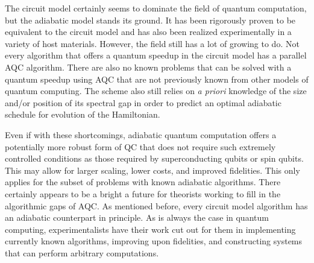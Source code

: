 \documentclass[%
 reprint,
 amsmath,amssymb,
 aps,
]{revtex4-1}
\begin{document}
	The circuit model certainly seems to dominate the field of quantum computation, but the adiabatic model stands its ground. It has been rigorously proven to be equivalent to the circuit model and has also been realized experimentally in a variety of host materials. However, the field still has a lot of growing to do. Not every algorithm that offers a quantum speedup in the circuit model has a parallel AQC algorithm. There are also no known problems that can be solved with a quantum speedup using AQC that are not previously known from other models of quantum computing. The scheme also still relies on \textit{a priori} knowledge of the size and/or position of its spectral gap in order to predict an optimal adiabatic schedule for evolution of the Hamiltonian.
	
	Even if with these shortcomings, adiabatic quantum computation offers a potentially more robust form of QC that does not require such extremely controlled conditions as those required by superconducting qubits or spin qubits. This may allow for larger scaling, lower costs, and improved fidelities. This only applies for the subset of problems with known adiabatic algorithms. There certainly appears to be a bright a future for theorists working to fill in the algorithmic gaps of AQC. As mentioned before, every circuit model algorithm has an adiabatic counterpart in principle. As is always the case in quantum computing, experimentalists have their work cut out for them in implementing currently known algorithms, improving upon fidelities, and constructing systems that can perform arbitrary computations.
\end{document}
